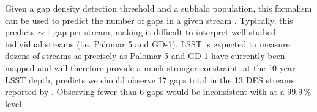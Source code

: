 Given a gap density detection threshold and a subhalo population, this formalism can be used to predict the number of gaps in a given stream \citep{erkal2016}. Typically, this predicts $ {\sim}\, 1$ gap per stream, making it difficult to interpret well-studied individual streams (i.e. Palomar 5 and GD-1). LSST is expected to measure dozens of streams as precisely as Palomar 5 and GD-1 have currently been mapped and will therefore provide a much stronger constraint: at the 10 year LSST depth, \LCDM predicts we should observe 17 gaps total in the 13 DES streams reported by \cite{2018ApJ...862..114S}. Observing fewer than 6 gaps would be inconsistent with \LCDM at a 99.9\,\% level. 






